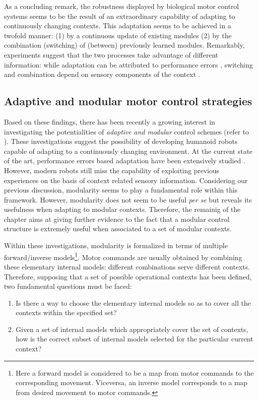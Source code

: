 \documentclass{svmult}
\begin{document}
As a concluding remark, the robustness displayed by biological motor control
systems seems to be the result of an extraordinary capability of adapting to
continuously changing contexts. This adaptation seems to be achieved in a twofold
manner: (1) by a continuous update of existing modules (2) by the combination (switching)
of (between) previously learned modules. Remarkably, experiments suggest that the two
processes take advantage of different information: while adaptation 
can be attributed to performance errors \cite{Shadmehr}, switching and 
combination depend on sensory components of the context \cite{Shelhamer}. 

\subsection{Adaptive and modular motor control strategies}

Based on these findings, there has been recently a growing interest
in investigating the potentialities of \emph{adaptive and modular}
control schemes (refer to \cite{WolpertKawato1998, Mussa-Ivaldi}).
These investigations suggest the possibility of developing humanoid robots 
capable of adapting to a continuously changing environment. At the current 
state of the art, performance errors based adaptation have been extensively
studied \cite{Slotine, sastry89adaptive}. However, modern robots still miss the capability 
of exploiting previous experiences on the basis of context related sensory
information. Considering our previous discussion, modularity seems to 
play a fundamental role within this framework. However, modularity does not seem to be useful 
\emph{per se} but reveals its usefulness when adapting to modular
contexts. Therefore, the remainig of the chapter aims at giving 
further evidence to the fact that a modular control structure is 
extremely useful when associated to a set of modular contexts.

Within these investigations, modularity is
formalized in terms of multiple forward/inverse models\footnote{Here a
forward model is considered to be a map from motor commands to the 
corresponding movement. Viceversa, an inverse model corresponds to 
a map from desired movement to motor commands.}. Motor commands are 
usually obtained by combining these elementary internal models: different
combinations serve different contexts. Therefore, supposing that a set 
of possible operational contexts has been defined, two fundamental questions 
must be faced:

\begin{enumerate}

\item Is there a way to choose the elementary internal models so as to
cover all the contexts within the specified set?

\item Given a set of internal models which appropriately cover the set
of contexts, how is the correct subset of internal models selected 
for the particular current context?

\end{enumerate}
\end{document}
